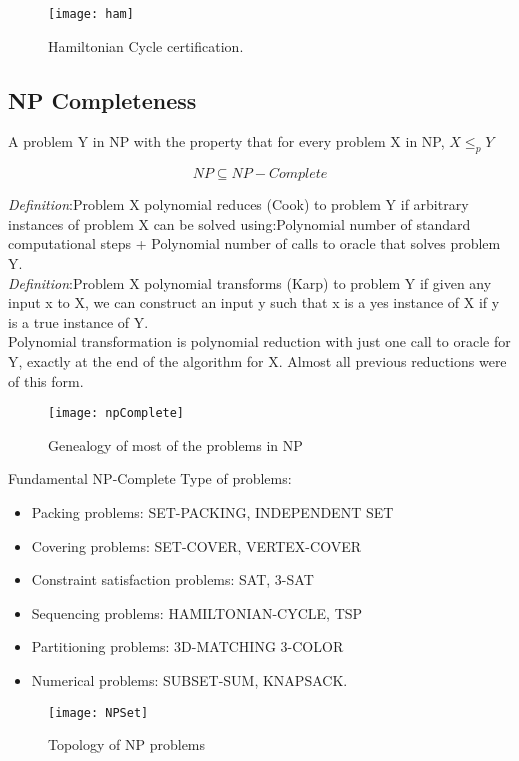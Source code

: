 \begin{figure}[H]
    \centering
    \texttt{[image: ham]}
    \caption{Hamiltonian Cycle certification.}
\end{figure}

\clearpage

\subsection{NP Completeness}

A problem Y in NP with the property that for every problem X in NP, $X \leq _{p} Y$

\[NP \subseteq NP-Complete\]

\emph{Definition}:Problem X polynomial reduces (Cook) to problem Y if arbitrary instances of problem X can be solved using:Polynomial number of standard computational steps + Polynomial number of calls to oracle that solves problem Y.\\

\emph{Definition}:Problem X polynomial transforms (Karp) to problem Y if given any input x to X, we can construct an input y such that x is a yes instance of X if y is a true instance of Y.\\

Polynomial transformation is polynomial reduction with just one call to oracle for Y, exactly at the end of the algorithm for X. Almost all previous reductions were of this form.


\begin{figure}[H]
    \centering
    \texttt{[image: npComplete]}
    \caption{Genealogy of most of the problems in NP}
\end{figure}

Fundamental NP-Complete Type of problems:
\begin{itemize}
    \item{Packing problems: SET-PACKING, INDEPENDENT SET}
    \item{Covering problems: SET-COVER, VERTEX-COVER}
    \item{Constraint satisfaction problems: SAT, 3-SAT}
    \item{Sequencing problems: HAMILTONIAN-CYCLE, TSP}
    \item{Partitioning problems: 3D-MATCHING 3-COLOR}
    \item{Numerical problems: SUBSET-SUM, KNAPSACK.}
\end{itemize}

\begin{figure}[H]
    \centering
    \texttt{[image: NPSet]}
    \caption{Topology of NP problems}
\end{figure}

\clearpage
